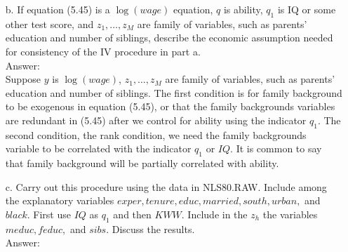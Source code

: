 \documentclass[10pt]{article}
\begin{document}
\begin{enumerate}
\item[b.] If equation (5.45) is a $\log(wage)$ equation, $q$ is ability, $q_1$ is IQ or some other test score, and $z_1,\ldots,z_M$ are family of variables, such as parents' education and number of siblings, describe the economic assumption needed for consistency of the IV procedure in part a.
\\ Answer:\\
Suppose $y$ is $\log(wage)$, $z_1,\ldots,z_M$ are family of variables, such as parents' education and number of siblings. The first condition is for family background to be exogenous in equation (5.45), or that the family backgrounds variables are redundant in (5.45) after we control for ability using the indicator $q_1$. The second condition, the rank condition, we need the family backgrounds variable to be correlated with the indicator $q_1$ or $IQ$. It is common to say that family background will be partially correlated with ability.

\item[c.] Carry out this procedure using the data in NLS80.RAW. Include among the explanatory variables $exper, tenure,educ,married,south,urban,$ and $black$. First use $IQ$ as $q_1$ and then $KWW$. Include in the $z_h$ the variables $meduc,feduc,$ and $sibs.$ Discuss the results.
\\ Answer:\\
\end{enumerate}
\end{document}

